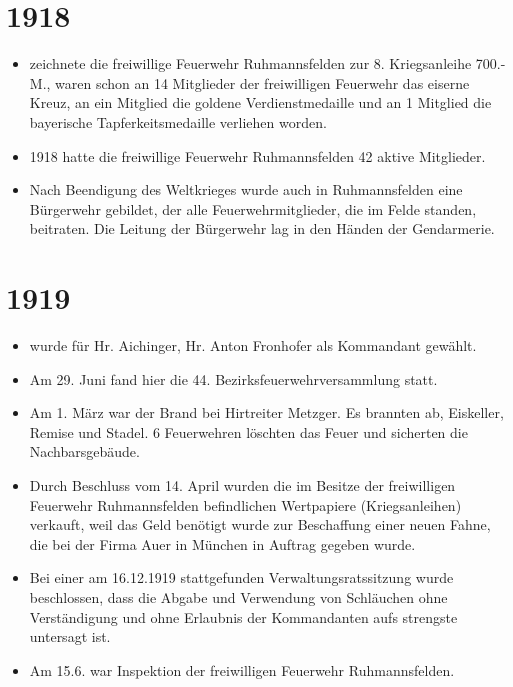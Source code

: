 \documentclass[12pt,a4paper]{book}
\begin{document}
\section*{1918}

\begin{itemize}
\item zeichnete die freiwillige Feuerwehr Ruhmannsfelden zur 8. Kriegsanleihe
700.- M., waren schon an 14 Mitglieder der freiwilligen Feuerwehr das eiserne
Kreuz, an ein Mitglied die goldene Verdienstmedaille und an 1 Mitglied die
bayerische Tapferkeitsmedaille verliehen worden.

\item 1918 hatte die freiwillige Feuerwehr Ruhmannsfelden 42 aktive Mitglieder.

\item Nach Beendigung des Weltkrieges wurde auch in Ruhmannsfelden eine
Bürgerwehr gebildet, der alle Feuerwehrmitglieder, die im Felde standen,
beitraten. Die Leitung der Bürgerwehr lag in den Händen der Gendarmerie.
\end{itemize}

\section*{1919}

\begin{itemize}
\item wurde für Hr. Aichinger, Hr. Anton Fronhofer als Kommandant gewählt.

\item Am 29. Juni fand hier die 44. Bezirksfeuerwehrversammlung statt.

\item Am 1. März war der Brand bei Hirtreiter Metzger. Es brannten ab,
Eiskeller, Remise und Stadel. 6 Feuerwehren löschten das Feuer und sicherten die
Nachbarsgebäude.

\item Durch Beschluss vom 14. April wurden die im Besitze der freiwilligen
Feuerwehr Ruhmannsfelden befindlichen Wertpapiere (Kriegsanleihen) verkauft,
weil das Geld benötigt wurde zur Beschaffung einer neuen Fahne, die bei der
Firma Auer in München in Auftrag gegeben wurde.

\item Bei einer am 16.12.1919 stattgefunden Verwaltungsratssitzung wurde
beschlossen, dass die Abgabe und Verwendung von Schläuchen ohne Verständigung
und ohne Erlaubnis der Kommandanten aufs strengste untersagt ist.

\item Am 15.6. war Inspektion der freiwilligen Feuerwehr Ruhmannsfelden.
\end{itemize}
\end{document}
